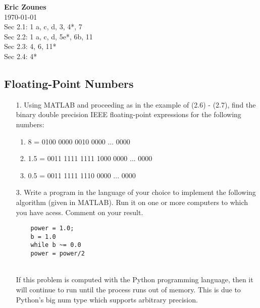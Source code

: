\documentclass[12pt,letterpaper]{article}
\begin{document}
\begin{flushright}
\end{flushright}
\begin{flushleft}
\textbf{Eric Zounes} \\
\today \\ 
Sec 2.1: 1 a, c, d, 3, 4*, 7 \\
Sec 2.2: 1 a, c, d, 5e*, 6b, 11 \\
Sec 2.3: 4, 6, 11* \\
Sec 2.4: 4* \\
\end{flushleft}
\subsection{Floating-Point Numbers} 
\begin{enumerate} 
	\item[1.] Using MATLAB and proceeding as in the example of (2.6) - (2.7), find the binary double precision IEEE floating-point expressions for the following numbers:
	\begin{enumerate} 
		\item 8 = 0100 0000 0010 0000 ... 0000 
		\item 1.5 = 0011 1111 1111 1000 0000 ... 0000 
		\item 0.5 = 0011 1111 1110 0000 ... 0000 
	\end{enumerate} 
	\item[3.] Write a program in the language of your choice to implement the following algorithm (given in MATLAB). Run it on one or more computers to which you have acess. Comment on your result. 
	\begin{verbatim}
	power = 1.0;
	b = 1.0
	while b ~= 0.0
	power = power/2
	\end{verbatim} \\
	If this problem is computed with the Python programming language, then it will continue to run until the process runs out of memory. This is due to Python's big num type which supports arbitrary precision. \\ 


\end{enumerate}
\end{document}
